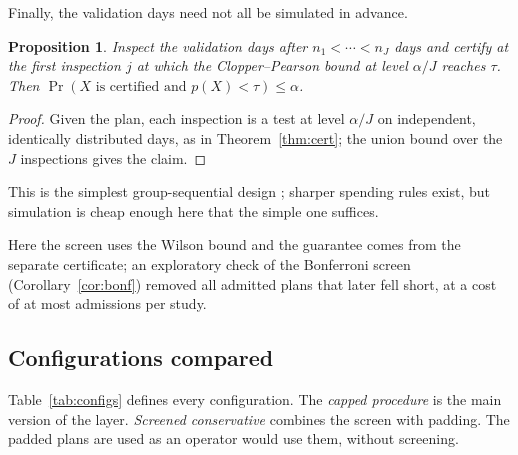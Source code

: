 \documentclass[11pt,a4paper]{article}
\newtheorem{proposition}{Proposition}
\theoremstyle{remark}
\begin{document}
Finally, the validation days need not all be simulated in advance.

\begin{proposition}\label{prop:seq}
Inspect the validation days after $n_1<\cdots<n_J$ days and certify at the first
inspection $j$ at which the Clopper--Pearson bound at level $\alpha/J$ reaches $\tau$.
Then $\Pr(X\text{ is certified and }p(X)<\tau)\le\alpha$.
\end{proposition}

\begin{proof}
Given the plan, each inspection is a test at level $\alpha/J$ on independent, identically
distributed days, as in Theorem~\ref{thm:cert}; the union bound over the $J$ inspections
gives the claim.
\end{proof}

This is the simplest group-sequential design \citep{pocock1977,jennison2000}; sharper
spending rules exist, but simulation is cheap enough here that the simple one suffices.

Here the screen uses the Wilson bound and the guarantee comes from the separate
certificate; an exploratory check of the Bonferroni screen (Corollary~\ref{cor:bonf})
removed all \FwMissOrig{} admitted plans that later fell short, at a cost of at most
\FwLostMax{} admissions per study.

\subsection{Configurations compared}

Table~\ref{tab:configs} defines every configuration. The \emph{capped procedure}
is the main version of the layer. \emph{Screened conservative} combines the screen
with padding. The padded plans are used as an operator would use them, without
screening.
\end{document}
